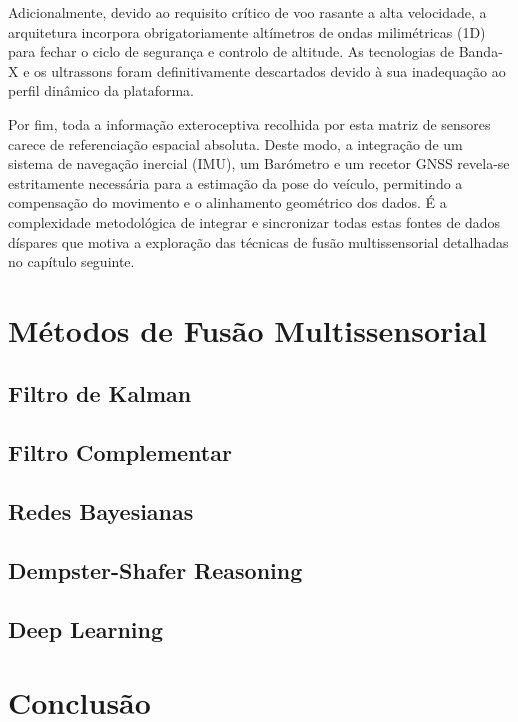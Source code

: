 \documentclass[11pt,a4paper]{article}
\begin{document}
Adicionalmente, devido ao requisito crítico de voo rasante a alta velocidade, a arquitetura incorpora obrigatoriamente altímetros de ondas milimétricas (1D) para fechar o ciclo de segurança e controlo de altitude. As tecnologias de Banda-X e os ultrassons foram definitivamente descartados devido à sua inadequação ao perfil dinâmico da plataforma.

Por fim, toda a informação exteroceptiva recolhida por esta matriz de sensores carece de referenciação espacial absoluta. Deste modo, a integração de um sistema de navegação inercial (IMU), um Barómetro e um recetor GNSS revela-se estritamente necessária para a estimação da pose do veículo, permitindo a compensação do movimento e o alinhamento geométrico dos dados. É a complexidade metodológica de integrar e sincronizar todas estas fontes de dados díspares que motiva a exploração das técnicas de fusão multissensorial detalhadas no capítulo seguinte.


\section{Métodos de Fusão Multissensorial}\label{sec:fusao}

\subsection{Filtro de Kalman}

\subsection{Filtro Complementar}

\subsection{Redes Bayesianas}

\subsection{Dempster-Shafer Reasoning}

\subsection{Deep Learning}

\section{Conclusão}\label{sec:conclusao}


\printbibliography[title={Referências Bibliográficas}]
\end{document}
